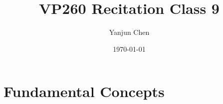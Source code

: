 \documentclass{beamer}
\title[VP260 RC]{VP260 Recitation Class 9} %
\author{Yanjun Chen} %
\institute[UM-SJTU JI] %
{
    University of Michigan - Shanghai Jiao Tong University Joint Institute\\%
\medskip
}
\date{\today} %
\begin{document}
\begin{frame}
    \titlepage %
\end{frame}



\section{Fundamental Concepts} %


\end{document}
